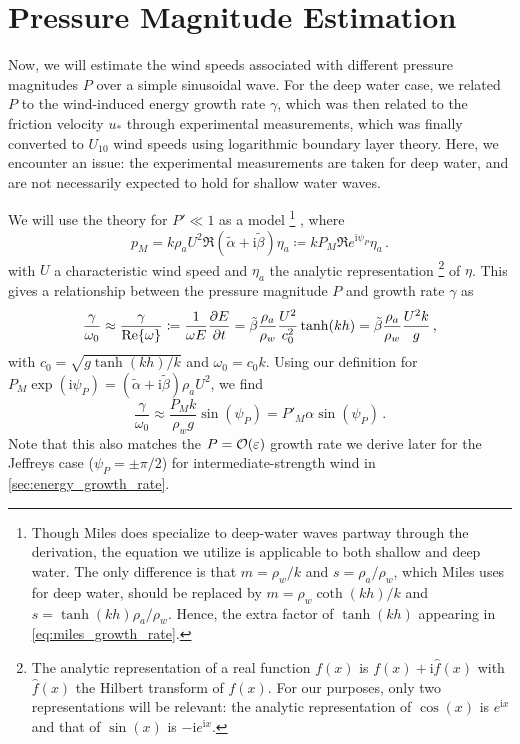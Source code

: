 \documentclass{jfm}
\let\Oldsection\section
\renewcommand{\section}{\FloatBarrier\Oldsection}
\newcommand{\im}{\mathrm{i}}
\renewcommand*{\epsilon}{\varepsilon}
\begin{document}
\section{Pressure Magnitude Estimation}
Now, we will estimate the wind speeds associated with different pressure
magnitudes $P$ over a simple sinusoidal wave.
For the deep water case, we related $P$ to the wind-induced energy growth
rate $\gamma$, which was then related to the friction velocity $u_*$
through experimental measurements, which was finally converted to
$U_{10}$ wind speeds using logarithmic boundary layer theory.
Here, we encounter an issue: the experimental measurements are taken for
deep water, and are not necessarily expected to hold for shallow water
waves.

We will use the \citet{miles1957generation} theory for $P' \ll 1$ as a model%
\footnote{
  Though Miles does specialize to deep-water waves partway through the
  derivation, the equation we utilize is applicable to both shallow and
  deep water.
  The only difference is that $m = \rho_w/k$ and $s=\rho_a/\rho_w$,
  which Miles uses for deep water, should be replaced by
  $m=\rho_w\coth(kh)/k$ and $s = \tanh(kh) \rho_a/\rho_w$.
  Hence, the extra factor of $\tanh(kh)$ appearing in
  \cref{eq:miles_growth_rate}.
}%
, where
\begin{equation}
  p_M = k \rho_a U^2 \Re{(\tilde{\alpha} + \im \tilde{\beta}) \eta_a}
  \coloneqq k P_M \Re{ e^{\im \psi_P} \eta_a} \,.
\end{equation}
with $U$ a characteristic wind speed and $\eta_a$ the analytic
representation%
\footnote{
  The analytic representation of a real function $f(x)$ is $f(x) + \im
  \hat{f}(x)$ with $\hat{f}(x)$ the Hilbert transform of $f(x)$.
  For our purposes, only two representations will be relevant: the
  analytic representation of $\cos(x)$ is $e^{\im x}$ and that of
  $\sin(x)$ is $-\im e^{\im x}$.
}
of $\eta$.
This gives a relationship between the pressure magnitude $P$ and growth
rate $\gamma$ as
\begin{equation}
  \frac{\gamma}{\omega_0} \approx \frac{\gamma}{\Re{\omega}} \coloneqq
  \frac{1}{\omega E} \pdv{E}{t}
  = \tilde{\beta} \frac{\rho_a}{\rho_w} \frac{U^2}{c_0^2} \tanh(kh)
  = \tilde{\beta} \frac{\rho_a}{\rho_w} \frac{U^2 k}{g} \,,
  \label{eq:miles_growth_rate}
\end{equation}
with $c_0 = \sqrt{g\tanh(kh)/k}$ and $\omega_0 = c_0 k$.
Using our definition for $P_M \exp(\im \psi_P) = (\tilde{\alpha} + \im
\tilde{\beta}) \rho_a U^2$, we find
\begin{equation}
  \frac{\gamma}{\omega_0} \approx \frac{P_M k}{\rho_w g} \sin(\psi_P)
  = P'_M \alpha \sin(\psi_P) \,.
\end{equation}
Note that this also matches the $P = \order{\epsilon}$ growth rate we
derive later for the Jeffreys case (\ie $\psi_P = \pm \pi/2$) for
intermediate-strength wind in \cref{sec:energy_growth_rate}.
\end{document}

